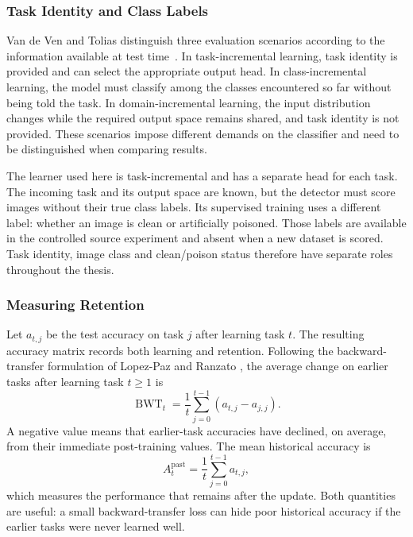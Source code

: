 \subsubsection{Task Identity and Class Labels}

Van de Ven and Tolias distinguish three evaluation scenarios according to the
information available at test time~\cite{vandeven2019scenarios}. In
task-incremental learning, task identity is provided and can select the
appropriate output head. In class-incremental learning, the model must
classify among the classes encountered so far without being told the task.
In domain-incremental learning, the input distribution changes while the
required output space remains shared, and task identity is not provided.
These scenarios impose different demands on the classifier and need to be
distinguished when comparing results.

The learner used here is task-incremental and has a separate head for each
task. The incoming task and its output space are known, but the detector
must score images without their true class labels. Its supervised training
uses a different label: whether an image is clean or artificially poisoned.
Those labels are available in the controlled source experiment and absent
when a new dataset is scored. Task identity, image class and clean/poison
status therefore have separate roles throughout the thesis.

\subsubsection{Measuring Retention}

Let $a_{t,j}$ be the test accuracy on task $j$ after learning task $t$.
The resulting accuracy matrix records both learning and retention. Following
the backward-transfer formulation of Lopez-Paz and Ranzato
\cite{lopezpaz2017gem}, the average change on earlier tasks after learning
task $t\geq 1$ is
\begin{equation}
    \operatorname{BWT}_t
    = \frac{1}{t}\sum_{j=0}^{t-1}(a_{t,j}-a_{j,j}).
    \label{eq:bg-bwt}
\end{equation}
A negative value means that earlier-task accuracies have declined, on
average, from their immediate post-training values. The mean historical
accuracy is
\begin{equation}
    A_t^{\mathrm{past}}=\frac{1}{t}\sum_{j=0}^{t-1}a_{t,j},
    \label{eq:bg-past-accuracy}
\end{equation}
which measures the performance that remains after the update. Both quantities
are useful: a small backward-transfer loss can hide poor historical accuracy
if the earlier tasks were never learned well.

